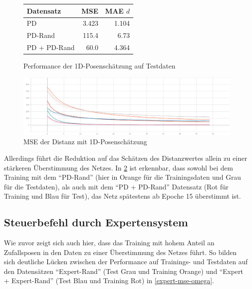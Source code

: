 \begin{figure}[H]
	\centering
	\begin{tabular}[t]{|l|r|r|}
		\hline
		Datensatz & MSE & MAE $d$ \\
		\hline
		PD & 3.423 & 1.104 \\
		\hline
		PD-Rand & 115.4 & 6.73 \\
		\hline
		PD + PD-Rand & 60.0 & 4.364 \\
		\hline
	\end{tabular}
	\caption{Performance der 1D-Posenschätzung auf Testdaten}
	\label{1d-pose-performance}
\end{figure}

\begin{figure}[H]
	\centering
	\includegraphics[width=\linewidth]{kapitel5/images/d-only/Loss-d-only.png}
	\caption{MSE der Distanz mit 1D-Posenschätzung}
	\label{1d-poses-mse-d}
\end{figure}

Allerdings führt die Reduktion auf das Schätzen des Distanzwertes allein zu einer stärkeren Überstimmung des Netzes. In \ref{1d-poses-mse-d} ist erkennbar, dass sowohl bei dem Training mit dem ``PD-Rand'' (hier in Orange für die Trainingsdaten und Grau für die Testdaten), als auch mit dem ``PD + PD-Rand'' Datensatz (Rot für Training und Blau für Test), das Netz spätestens ab Epoche 15 überstimmt ist.

\subsection{Steuerbefehl durch Expertensystem}


Wie zuvor zeigt sich auch hier, dass das Training mit hohem Anteil an Zufallsposen in den Daten zu einer Überstimmung des Netzes führt. So bilden sich deutliche Lücken zwischen der Performance auf Trainings- und Testdaten auf den Datensätzen ``Expert-Rand'' (Test Grau und Training Orange) und ``Expert + Expert-Rand'' (Test Blau und Training Rot) in \ref{expert-mse-omega}.


